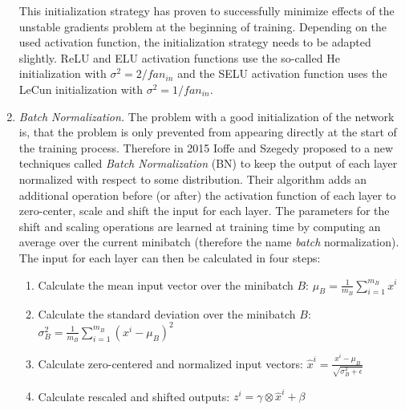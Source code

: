\begin{enumerate}
  This initialization strategy has proven to successfully minimize effects of the unstable gradients problem at the beginning of training. Depending on the used activation function, the initialization strategy needs to be adapted slightly. ReLU and ELU activation functions use the so-called He initialization with $\sigma^2 = 2 / fan_{in}$ and the SELU activation function uses the LeCun initialization with $\sigma^2 = 1 / fan_{in}$.
  \item \textit{Batch Normalization.} The problem with a good initialization of the network is, that the problem is only prevented from appearing directly at the start of the training process. Therefore in 2015 Ioffe and Szegedy proposed to a new techniques called \textit{Batch Normalization} (BN) to keep the output of each layer normalized with respect to some distribution. Their algorithm adds an additional operation before (or after) the activation function of each layer to zero-center, scale and shift the input for each layer. The parameters for the shift and scaling operations are learned at training time by computing an average over the current minibatch (therefore the name \textit{batch} normalization). The input for each layer can then be calculated in four steps:


  \begin{enumerate}\setcounter{enumii}{0}\renewcommand\theenumii{\arabic{enumii}}
    \item Calculate the mean input vector over the minibatch $B$: $\displaystyle \mu_B = \frac{1}{m_B} \sum_{i=1}^{m_B} x^i$ 
    \item Calculate the standard deviation over the minibatch $B$: $\displaystyle \sigma_B^2 = \frac{1}{m_B} \sum_{i=1}^{m_B} \left(x^i - \mu_B\right)^2$
    \item Calculate zero-centered and normalized input vectors: $\displaystyle \hat{x}^i = \frac{x^i - \mu_B}{\sqrt{\sigma_B^2 + \epsilon}}$
    \item Calculate rescaled and shifted outputs: $\displaystyle z^i = \gamma \otimes \hat{x}^i + \beta$
  \end{enumerate}
  

\end{enumerate}

